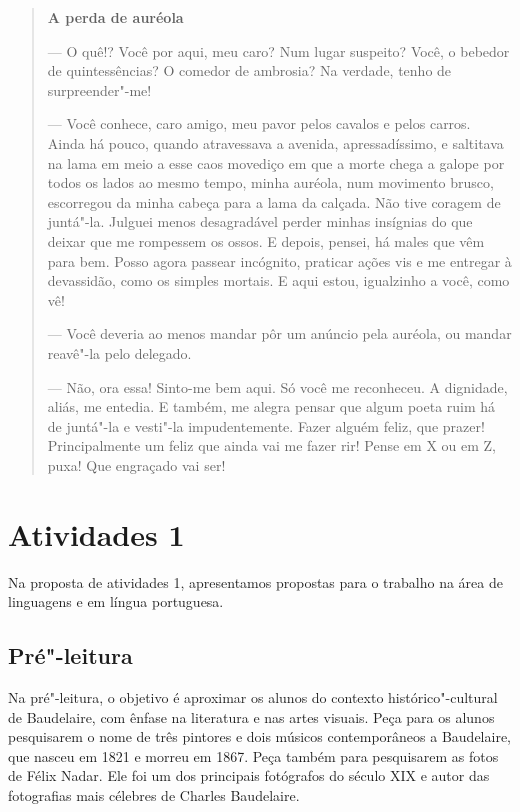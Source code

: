 \documentclass[12pt]{extarticle}
\begin{document}
\begin{quote}
{\centering\textbf{A perda de auréola}\par}

--- O quê!? Você por aqui, meu caro? Num lugar suspeito?
Você, o bebedor de quintessências? O comedor de ambrosia? Na
verdade, tenho de surpreender"-me!

--- Você conhece, caro amigo, meu pavor pelos cavalos e pelos carros. Ainda
há pouco, quando atravessava a avenida, apressadíssimo, e
saltitava na lama em meio a esse caos movediço em que a morte chega a
galope por todos os lados ao mesmo tempo, minha auréola, num movimento
brusco, escorregou da minha cabeça para a lama da calçada. Não tive
coragem de juntá"-la. Julguei menos desagradável perder minhas
insígnias do que deixar que me rompessem os ossos. E depois, pensei, há
males que vêm para bem. Posso agora passear incógnito, praticar ações
vis e me entregar à devassidão, como os simples mortais. E 
aqui estou, igualzinho a você, como vê!

--- Você deveria ao menos mandar pôr um anúncio pela auréola, ou mandar
reavê"-la pelo delegado.

--- Não, ora essa! Sinto-me bem aqui. Só você me reconheceu. A dignidade, aliás, me entedia. E também, me alegra pensar que algum poeta ruim
há de juntá"-la e vesti"-la impudentemente. Fazer alguém feliz, que
prazer! Principalmente um feliz que ainda vai me fazer rir! Pense em X ou em
Z, puxa! Que engraçado vai ser!

\end{quote}


\section{Atividades 1}

Na proposta de atividades 1, apresentamos propostas 
para o trabalho na área de linguagens e em língua portuguesa.

\subsection{Pré"-leitura}




Na pré"-leitura, o objetivo é aproximar os alunos do contexto
histórico"-cultural de Baudelaire, com ênfase na literatura e nas artes
visuais. Peça para os alunos pesquisarem o nome de três pintores e 
dois músicos contemporâneos a Baudelaire, que nasceu em 1821 e 
morreu em 1867. Peça também para pesquisarem as fotos de Félix Nadar. Ele foi 
um dos principais fotógrafos do século XIX e autor das 
fotografias mais célebres de Charles Baudelaire.  
\end{document}
